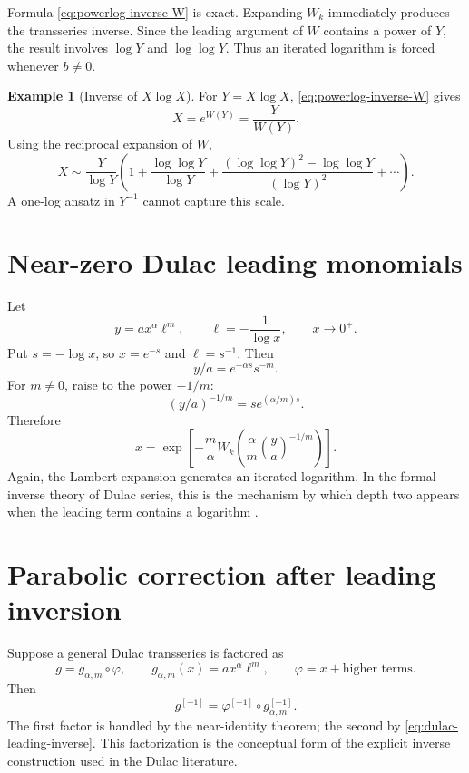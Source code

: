 \documentclass[11pt,openany]{book}
\theoremstyle{definition}
\newtheorem{example}{Example}[chapter]
\theoremstyle{plain}
\theoremstyle{remark}
\newcommand{\invcomp}{^{[-1]}}
\begin{document}
Formula \cref{eq:powerlog-inverse-W} is exact. Expanding \(W_k\) immediately produces the transseries inverse. Since the leading argument of \(W\) contains a power of \(Y\), the result involves \(\log Y\) and \(\log\log Y\). Thus an iterated logarithm is forced whenever \(b\ne0\).

\begin{example}[Inverse of \(X\log X\)]
For \(Y=X\log X\), \cref{eq:powerlog-inverse-W} gives
\begin{equation}\label{eq:inverse-XlogX-exact}
 X=e^{W(Y)}=\frac{Y}{W(Y)}.
\end{equation}
Using the reciprocal expansion of \(W\),
\[
 X\sim\frac{Y}{\log Y}
 \left(1+\frac{\log\log Y}{\log Y}
 +\frac{(\log\log Y)^2-\log\log Y}{(\log Y)^2}
 +\cdots\right).
\]
A one-log ansatz in \(Y^{-1}\) cannot capture this scale.
\end{example}

\section{Near-zero Dulac leading monomials}
Let
\begin{equation}\label{eq:dulac-leading}
 y=a x^\alpha\ell^m,
 \qquad \ell=-\frac1{\log x},
 \qquad x\to0^+.
\end{equation}
Put \(s=-\log x\), so \(x=e^{-s}\) and \(\ell=s^{-1}\). Then
\[
 y/a=e^{-\alpha s}s^{-m}.
\]
For \(m\ne0\), raise to the power \(-1/m\):
\[
 (y/a)^{-1/m}=s e^{(\alpha/m)s}.
\]
Therefore
\begin{equation}\label{eq:dulac-leading-inverse}
 x=
 \exp\left[-\frac m\alpha
 W_k\left(
 \frac\alpha m\left(\frac ya\right)^{-1/m}
 \right)\right].
\end{equation}
Again, the Lambert expansion generates an iterated logarithm. In the formal inverse theory of Dulac series, this is the mechanism by which depth two appears when the leading term contains a logarithm \cite{mardesic-length}.

\section{Parabolic correction after leading inversion}
Suppose a general Dulac transseries is factored as
\begin{equation}\label{eq:dulac-factor}
 g=g_{\alpha,m}\circ\varphi,
 \qquad
 g_{\alpha,m}(x)=a x^\alpha\ell^m,
 \qquad
 \varphi=x+\text{higher terms}.
\end{equation}
Then
\begin{equation}\label{eq:dulac-factor-inverse}
 g\invcomp=\varphi\invcomp\circ g_{\alpha,m}\invcomp.
\end{equation}
The first factor is handled by the near-identity theorem; the second by \cref{eq:dulac-leading-inverse}. This factorization is the conceptual form of the explicit inverse construction used in the Dulac literature.
\end{document}
